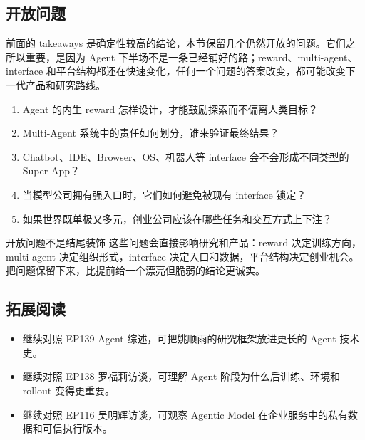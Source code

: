 \subsection{开放问题}

前面的 takeaways 是确定性较高的结论，本节保留几个仍然开放的问题。它们之所以重要，是因为 Agent 下半场不是一条已经铺好的路；reward、multi-agent、interface 和平台结构都还在快速变化，任何一个问题的答案改变，都可能改变下一代产品和研究路线。

\begin{enumerate}
\item Agent 的内生 reward 怎样设计，才能鼓励探索而不偏离人类目标？
\item Multi-Agent 系统中的责任如何划分，谁来验证最终结果？
\item Chatbot、IDE、Browser、OS、机器人等 interface 会不会形成不同类型的 Super App？
\item 当模型公司拥有强入口时，它们如何避免被现有 interface 锁定？
\item 如果世界既单极又多元，创业公司应该在哪些任务和交互方式上下注？
\end{enumerate}

\begin{warningbox}{开放问题不是结尾装饰}
这些问题会直接影响研究和产品：reward 决定训练方向，multi-agent 决定组织形式，interface 决定入口和数据，平台结构决定创业机会。把问题保留下来，比提前给一个漂亮但脆弱的结论更诚实。
\end{warningbox}

\subsection{拓展阅读}

\begin{itemize}
\item 继续对照 EP139 Agent 综述，可把姚顺雨的研究框架放进更长的 Agent 技术史。
\item 继续对照 EP138 罗福莉访谈，可理解 Agent 阶段为什么后训练、环境和 rollout 变得更重要。
\item 继续对照 EP116 吴明辉访谈，可观察 Agentic Model 在企业服务中的私有数据和可信执行版本。
\end{itemize}


